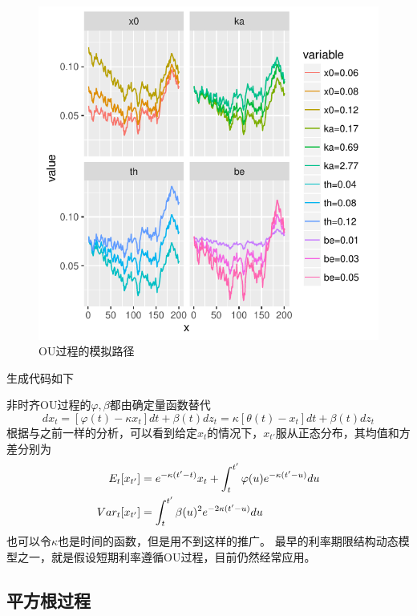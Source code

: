 \documentclass[UTF8]{ctexart}
\begin{document}
\begin{figure}[H]
\centering
\includegraphics{P54.pdf}

\caption*{OU过程的模拟路径\footnotemark}
\end{figure}
生成代码如下


非时齐OU过程的$\varphi,\beta$都由确定量函数替代
$$dx_t=[\varphi(t)-\kappa x_t]dt+\beta(t)dz_t=\kappa[\theta(t)-x_t]dt+\beta(t)dz_t$$
根据与之前一样的分析，可以看到给定$x_t$的情况下，$x_{t'}$服从正态分布，其均值和方差分别为
\begin{align}
E_t[x_{t'}] &= e^{-\kappa (t'-t)}x_t+\int_t^{t'}\varphi(u) e^{-\kappa (t'-u)} du \notag \\
Var_t[x_{t'}] &=\int_t^{t'}\beta(u)^2 e^{-2 \kappa(t'-u)}du \notag
\end{align}
也可以令$\kappa$也是时间的函数，但是用不到这样的推广。
最早的利率期限结构动态模型之一，就是假设短期利率遵循OU过程，目前仍然经常应用。

\subsection{平方根过程}
\end{document}
